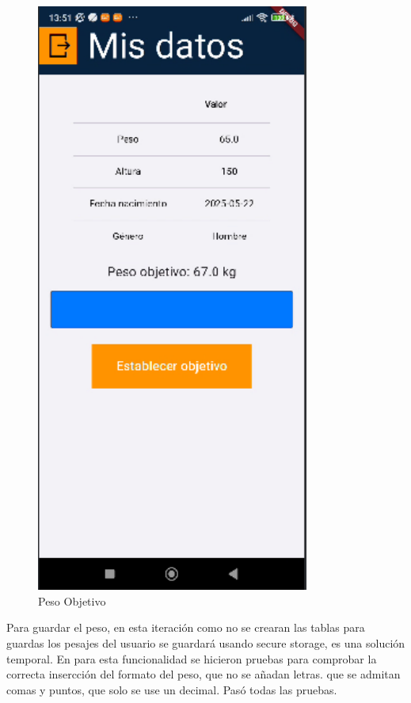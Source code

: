 \begin{figure}[H]
   \centering
    \includegraphics[width=0.8\textwidth]{pantallas/pesoObj.png}
    \caption{Peso Objetivo}
    \label{fig:pesoObj}
\end{figure}

Para guardar el peso, en esta iteración como no se crearan las tablas para guardas los pesajes del usuario se guardará usando secure storage, es una solución temporal. En para esta funcionalidad se hicieron pruebas para comprobar la correcta insercción del formato del peso, que no se añadan letras. que se admitan comas y puntos, que solo se use un decimal. Pasó todas las pruebas.


